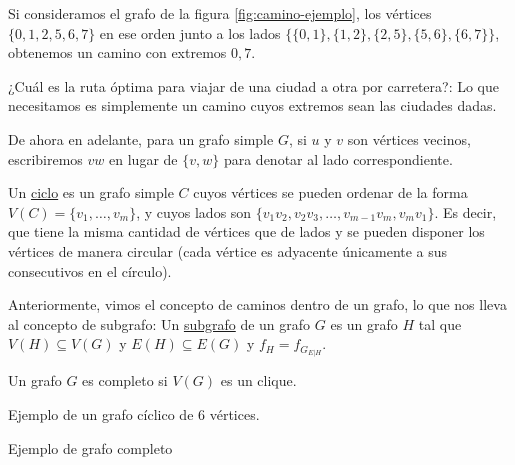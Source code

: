 \begin{ejem}
    Si consideramos el grafo de la figura \ref{fig:camino-ejemplo}, los vértices $\{0,1,2,5,6,7\}$ en ese orden junto a los lados $\{\{0,1\}, \{1,2\}, \{2,5\}, \{5,6\}, \{6,7\}\}$, obtenemos un camino con extremos $0, 7$.
\end{ejem}

\begin{prob}
    ¿Cuál es la ruta óptima para viajar de una ciudad a otra por carretera?: Lo que necesitamos es simplemente un camino cuyos extremos sean las ciudades dadas.
\end{prob}

\begin{notn}
    De ahora en adelante, para un grafo simple $G$, si $u$ y $v$ son vértices vecinos, escribiremos $vw$ en lugar de $\{v,w\}$ para denotar al lado correspondiente.
\end{notn}

\begin{defn}
    Un \ul{ciclo} es un grafo simple $C$ cuyos vértices se pueden ordenar de la forma $V(C) = \{v_1, \dots, v_m\}$, y cuyos lados son $\{v_1v_2, v_2v_3, \dots, v_{m-1}v_m, v_mv_1\}$. Es decir, que tiene la misma cantidad de vértices que de lados y se pueden disponer los vértices de manera circular (cada vértice es adyacente únicamente a sus consecutivos en el círculo).
\end{defn}

\begin{defn}
    Anteriormente, vimos el concepto de caminos dentro de un grafo, lo que nos lleva al concepto de subgrafo: Un \ul{subgrafo} de un grafo $G$ es un grafo $H$ tal que $V(H) \subseteq V(G)$ y $E(H) \subseteq E(G)$ y $f_H = f_{G_{E|H}}$.
\end{defn}

\begin{defn}
    Un grafo $G$ es completo si $V(G)$ es un clique.
\end{defn}

\begin{marginfigure}
    \centering
    \caption{Ejemplo de un grafo cíclico de $6$ vértices.}
\end{marginfigure}

\begin{marginfigure}
    \centering
    \caption{Ejemplo de grafo completo}
\end{marginfigure}

